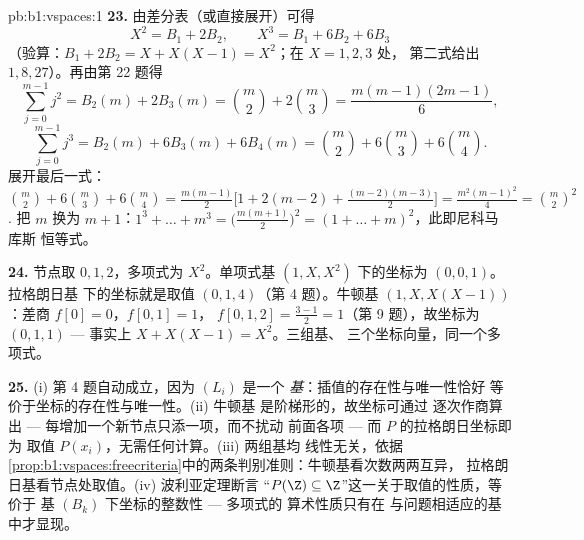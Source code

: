 \begin{solution}{pb:b1:vspaces:1}
\textbf{23.} 由差分表（或直接展开）可得
\[
X^2 = B_1 + 2 B_2, \qquad X^3 = B_1 + 6 B_2 + 6 B_3
\]
（验算：$B_1 + 2B_2 = X + X(X-1) = X^2$；在 $X = 1, 2, 3$ 处，
第二式给出 $1, 8, 27$）。再由第 22 题得
\[
\sum_{j=0}^{m-1} j^2 = B_2(m) + 2B_3(m)
= \binom m2 + 2\binom m3 = \frac{m(m-1)(2m-1)}{6},
\]
\[
\sum_{j=0}^{m-1} j^3 = B_2(m) + 6B_3(m) + 6B_4(m)
= \binom m2 + 6\binom m3 + 6\binom m4 .
\]
展开最后一式：$\binom m2 + 6\binom m3 + 6\binom
m4 = \frac{m(m-1)}{2}\bigl[1 + 2(m-2) +
\frac{(m-2)(m-3)}{2}\bigr] = \frac{m^2(m-1)^2}{4} = \binom m2^2$.
把 $m$ 换为 $m + 1$：$1^3 + \dots + m^3 =
\bigl(\frac{m(m+1)}2\bigr)^2 = (1 + \dots + m)^2$，此即尼科马库斯
恒等式。

\textbf{24.} 节点取 $0, 1, 2$，多项式为 $X^2$。单项式基
$(1, X, X^2)$ 下的坐标为 $(0, 0, 1)$。拉格朗日基
下的坐标就是取值 $(0, 1, 4)$（第 4 题）。牛顿基
$(1, X, X(X-1))$：差商 $f[0] = 0$，$f[0,1] = 1$，
$f[0,1,2] = \frac{3 - 1}{2} = 1$（第 9 题），故坐标为
$(0, 1, 1)$ --- 事实上 $X + X(X-1) = X^2$。三组基、
三个坐标向量，同一个多项式。

\textbf{25.} (i) 第 4 题自动成立，因为 $(L_i)$ 是一个
\emph{基}：插值的存在性与唯一性恰好
等价于坐标的存在性与唯一性。(ii) 牛顿基
是阶梯形的，故坐标可通过
逐次作商算出 --- 每增加一个新节点只添一项，而不扰动
前面各项 --- 而 $P$ 的拉格朗日坐标即为
取值 $P(x_i)$，无需任何计算。(iii) 两组基均
线性无关，依据
\cref{prop:b1:vspaces:freecriteria}中的两条判别准则：牛顿基看次数两两互异，
拉格朗日基看节点处取值。(iv) 波利亚定理断言
“$P(\Z) \subseteq \Z$”这一关于取值的性质，等价于
基 $(B_k)$ 下坐标的整数性 --- 多项式的
算术性质只有在
与问题相适应的基中才显现。
\end{solution}
